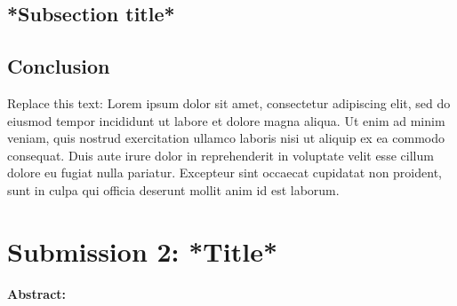 \documentclass[a4paper, 11pt]{article}
\begin{document}
\begin{multicols*}{2}
\vspace{0.3cm}
\subsection{*Subsection title*}




\vspace{0.3cm}
\subsection{Conclusion}

Replace this text: Lorem ipsum dolor sit amet, consectetur adipiscing elit, sed do eiusmod tempor incididunt ut labore et dolore magna aliqua. Ut enim ad minim veniam, quis nostrud exercitation ullamco laboris nisi ut aliquip ex ea commodo consequat. Duis aute irure dolor in reprehenderit in voluptate velit esse cillum dolore eu fugiat nulla pariatur. Excepteur sint occaecat cupidatat non proident, sunt in culpa qui officia deserunt mollit anim id est laborum.



\end{multicols*}



\newpage
\section{Submission 2: *Title*}

\textbf{Abstract: }
\end{document}
